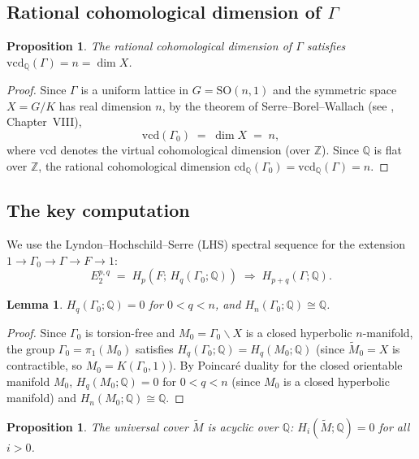 \documentclass[12pt]{article}
\newtheorem{lemma}[theorem]{Lemma}
\newtheorem{proposition}[theorem]{Proposition}
\newcommand{\Z}{\mathbb{Z}}
\newcommand{\Q}{\mathbb{Q}}
\newcommand{\SO}{\mathrm{SO}}
\newcommand{\cd}{\mathrm{cd}}
\newcommand{\vcd}{\mathrm{vcd}}
\newcommand{\tilM}{\widetilde{M}}
\begin{document}
\subsection{Rational cohomological dimension of $\Gamma$}

\begin{proposition}\label{prop:vcd}
The rational cohomological dimension of $\Gamma$ satisfies $\vcd_\Q(\Gamma) = n = \dim X$.
\end{proposition}

\begin{proof}
Since $\Gamma$ is a uniform lattice in $G = \SO(n,1)$ and the symmetric space $X = G/K$ has
real dimension $n$, by the theorem of Serre--Borel--Wallach (see \cite{Brown1982}, Chapter~VIII),
\[
  \vcd(\Gamma_0) \;=\; \dim X \;=\; n,
\]
where $\vcd$ denotes the virtual cohomological dimension (over $\Z$).  Since $\Q$ is flat over
$\Z$, the rational cohomological dimension $\cd_\Q(\Gamma_0) = \vcd_\Q(\Gamma) = n$.
\end{proof}

\subsection{The key computation}

We use the Lyndon--Hochschild--Serre (LHS) spectral sequence for the extension
$1 \to \Gamma_0 \to \Gamma \to F \to 1$:
\[
  E_2^{p,q} \;=\; H_p(F;\, H_q(\Gamma_0;\Q)) \;\Rightarrow\; H_{p+q}(\Gamma;\Q).
\]

\begin{lemma}\label{lem:gamma0acyclic}
$H_q(\Gamma_0;\Q) = 0$ for $0 < q < n$, and $H_n(\Gamma_0;\Q) \cong \Q$.
\end{lemma}

\begin{proof}
Since $\Gamma_0$ is torsion-free and $M_0 = \Gamma_0 \backslash X$ is a closed hyperbolic
$n$-manifold, the group $\Gamma_0 = \pi_1(M_0)$ satisfies
$H_q(\Gamma_0;\Q) = H_q(M_0;\Q)$ (since $\tilM_0 = X$ is contractible, so $M_0 = K(\Gamma_0,1)$).
By Poincar\'e duality for the closed orientable manifold $M_0$,
$H_q(M_0;\Q) = 0$ for $0 < q < n$ (since $M_0$ is a closed hyperbolic manifold) and
$H_n(M_0;\Q) \cong \Q$.
\end{proof}

\begin{proposition}\label{prop:Qacycliccover}
The universal cover $\tilM$ is acyclic over $\Q$: $H_i(\tilM;\Q) = 0$ for all $i > 0$.
\end{proposition}
\end{document}
